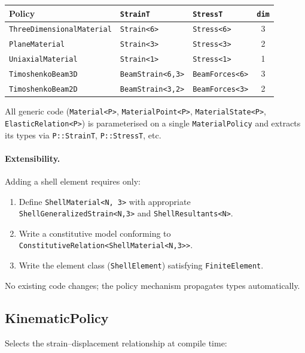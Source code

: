 \begin{center}
\small
\begin{tabular}{lllc}
  \toprule
  Policy & \texttt{StrainT} & \texttt{StressT} & \texttt{dim} \\
  \midrule
  \texttt{ThreeDimensionalMaterial} & \texttt{Strain<6>} & \texttt{Stress<6>} & 3 \\
  \texttt{PlaneMaterial}            & \texttt{Strain<3>} & \texttt{Stress<3>} & 2 \\
  \texttt{UniaxialMaterial}         & \texttt{Strain<1>} & \texttt{Stress<1>} & 1 \\
  \texttt{TimoshenkoBeam3D}         & \texttt{BeamStrain<6,3>} & \texttt{BeamForces<6>} & 3 \\
  \texttt{TimoshenkoBeam2D}         & \texttt{BeamStrain<3,2>} & \texttt{BeamForces<3>} & 2 \\
  \bottomrule
\end{tabular}
\end{center}

All generic code (\texttt{Material<P>}, \texttt{MaterialPoint<P>},
\texttt{MaterialState<P>}, \texttt{ElasticRelation<P>}) is parameterised
on a single \texttt{MaterialPolicy} and extracts its types via
\texttt{P::StrainT}, \texttt{P::StressT}, etc.

\paragraph{Extensibility.}
Adding a shell element requires only:
\begin{enumerate}[nosep]
  \item Define \texttt{ShellMaterial<N, 3>} with appropriate
        \texttt{ShellGeneralizedStrain<N,3>} and
        \texttt{ShellResultants<N>}.
  \item Write a constitutive model conforming to
        \texttt{ConstitutiveRelation<ShellMaterial<N,3>>}.
  \item Write the element class (\texttt{ShellElement}) satisfying
        \texttt{FiniteElement}.
\end{enumerate}
No existing code changes; the policy mechanism propagates types automatically.


\subsection{KinematicPolicy}
\label{sec:kin_policy}

Selects the strain--displacement relationship at compile time:

